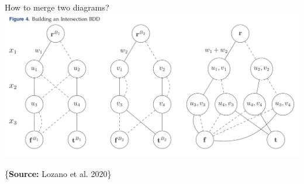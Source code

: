 \documentclass[10pt, xcolor=svgnames]{beamer}
\begin{document}
\begin{frame}[label={sec:org0b8194e}]{How to merge two diagrams?}
\centering
\includegraphics[width=\textwidth]{./img/merging.png}

\{\footnotesize\vspace{2ex}\textbf{Source:} Lozano et al. 2020\}
\end{frame}
\end{document}
